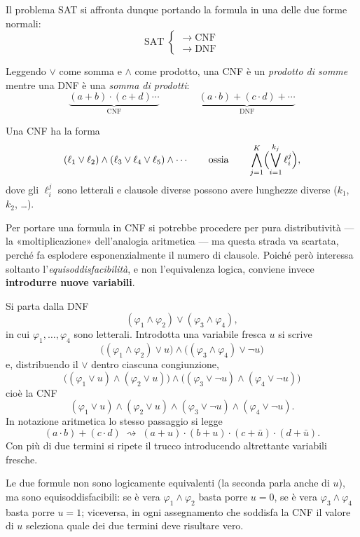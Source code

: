 Il problema SAT si affronta dunque portando la formula in una delle due forme normali:
\[
  \text{SAT}\;
  \begin{cases}
    \;\longrightarrow\;\text{CNF}\\[4pt]
    \;\longrightarrow\;\text{DNF}
  \end{cases}
\]

\begin{osservazione}
Leggendo $\vee$ come somma e $\wedge$ come prodotto, una CNF è un \emph{prodotto di somme}
mentre una DNF è una \emph{somma di prodotti}:
\[
  \underbrace{(a+b)\cdot(c+d)\cdots}_{\text{CNF}}
  \qquad\qquad
  \underbrace{(a\cdot b)+(c\cdot d)+\cdots}_{\text{DNF}}
\]
\end{osservazione}

Una CNF ha la forma
\[
  (\ell_1\vee\ell_2)\wedge(\ell_3\vee\ell_4\vee\ell_5)\wedge\cdots
  \qquad\text{ossia}\qquad
  \bigwedge_{j=1}^{K}\Bigl(\bigvee_{i=1}^{k_j}\ell^{j}_{i}\Bigr),
\]
dove gli $\ell^{j}_{i}$ sono letterali e clausole diverse possono avere lunghezze diverse
($k_1$, $k_2$, \dots).

Per portare una formula in CNF si potrebbe procedere per pura distributività --- la
«moltiplicazione» dell'analogia aritmetica --- ma questa strada va scartata, perché fa
esplodere esponenzialmente il numero di clausole. Poiché però interessa soltanto
l'\emph{equisoddisfacibilità}, e non l'equivalenza logica, conviene invece
\textbf{introdurre nuove variabili}.

\begin{esempio}
Si parta dalla DNF
\[
  (\varphi_1\wedge\varphi_2)\vee(\varphi_3\wedge\varphi_4),
\]
in cui $\varphi_1,\dots,\varphi_4$ sono letterali. Introdotta una variabile fresca $u$ si
scrive
\[
  \bigl((\varphi_1\wedge\varphi_2)\vee u\bigr)\wedge\bigl((\varphi_3\wedge\varphi_4)\vee\neg u\bigr)
\]
e, distribuendo il $\vee$ dentro ciascuna congiunzione,
\[
  \bigl((\varphi_1\vee u)\wedge(\varphi_2\vee u)\bigr)\wedge\bigl((\varphi_3\vee\neg u)\wedge(\varphi_4\vee\neg u)\bigr)
\]
cioè la CNF
\[
  (\varphi_1\vee u)\wedge(\varphi_2\vee u)\wedge(\varphi_3\vee\neg u)\wedge(\varphi_4\vee\neg u).
\]
In notazione aritmetica lo stesso passaggio si legge
\[
  (a\cdot b)+(c\cdot d)\;\rightsquigarrow\;(a+u)\cdot(b+u)\cdot(c+\bar u)\cdot(d+\bar u).
\]
Con più di due termini si ripete il trucco introducendo altrettante variabili fresche.
\end{esempio}

\begin{osservazione}
Le due formule non sono logicamente equivalenti (la seconda parla anche di $u$), ma sono
equisoddisfacibili: se è vera $\varphi_1\wedge\varphi_2$ basta porre $u=0$, se è vera
$\varphi_3\wedge\varphi_4$ basta porre $u=1$; viceversa, in ogni assegnamento che soddisfa la
CNF il valore di $u$ seleziona quale dei due termini deve risultare vero.
\end{osservazione}

